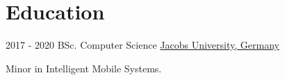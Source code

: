 \documentclass[letterpaper]{twentysecondcv} %
\begin{document}
\makeprofile %

\section{Education}

\begin{twenty} %
	\twentyitem
    	{2017 - 2020}
        {}
        {BSc. Computer Science}
        {\href{https://www.jacobs-university.de}{Jacobs University, Germany}}
        {Minor in Intelligent Mobile Systems.
        
        }
        
\end{twenty}

        

\end{document}

